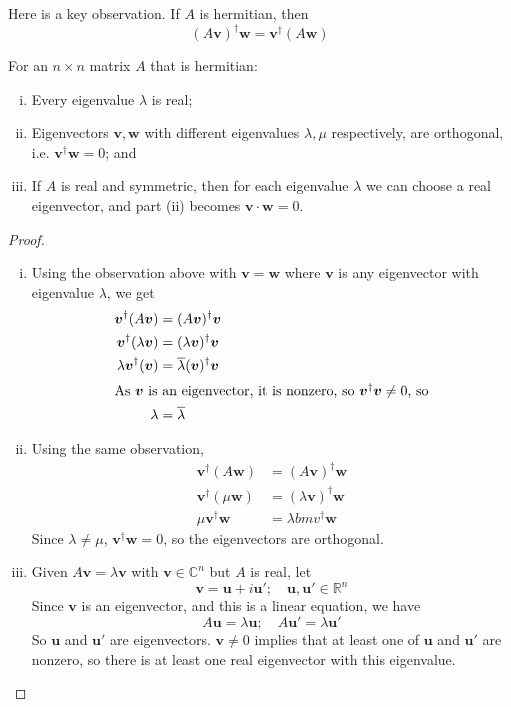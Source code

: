 \documentclass{article}
\begin{document}
Here is a key observation. If $A$ is hermitian, then
\[ (A\bm v)^\dagger \bm w = \bm v^\dagger (A \bm w) \]
\begin{theorem}
	For an $n \times n$ matrix $A$ that is hermitian:
	\begin{enumerate}[(i)]
		\item Every eigenvalue $\lambda$ is real;
		\item Eigenvectors $\bm v, \bm w$ with different eigenvalues $\lambda, \mu$ respectively, are orthogonal, i.e. $\bm v^\dagger \bm w = 0$; and
		\item If $A$ is real and symmetric, then for each eigenvalue $\lambda$ we can choose a real eigenvector, and part (ii) becomes $\bm v \cdot \bm w = 0$.
	\end{enumerate}
\end{theorem}
\begin{proof}
	\begin{enumerate}[(i)]
		\item Using the observation above with $\bm v = \bm w$ where $\bm v$ is any eigenvector with eigenvalue $\lambda$, we get
		      \begin{align*}
			      \bm v^\dagger (A\bm v)        & = (A\bm v)^\dagger \bm v                   \\
			      \bm v^\dagger (\lambda\bm v)  & = (\lambda\bm v)^\dagger \bm v             \\
			      \lambda \bm v^\dagger (\bm v) & = \overline{\lambda} (\bm v)^\dagger \bm v \\
			      \intertext{As $\bm v$ is an eigenvector, it is nonzero, so $\bm v^\dagger \bm v \neq 0$, so}
			      \lambda                       & = \overline \lambda
		      \end{align*}
		\item Using the same observation,
		      \begin{align*}
			      \bm v^\dagger (A \bm w)   & = (A \bm v)^\dagger \bm w       \\
			      \bm v^\dagger (\mu \bm w) & = (\lambda \bm v)^\dagger \bm w \\
			      \mu \bm v^\dagger \bm w   & = \lambda bm v^\dagger \bm w
		      \end{align*}
		      Since $\lambda \neq \mu$, $\bm v^\dagger \bm w = 0$, so the eigenvectors are orthogonal.
		\item Given $A\bm v = \lambda \bm v$ with $\bm v \in \mathbb C^n$ but $A$ is real, let
		      \[ \bm v = \bm u + i\bm u';\quad \bm u, \bm u' \in \mathbb R^n \]
		      Since $\bm v$ is an eigenvector, and this is a linear equation, we have
		      \[ A\bm u = \lambda \bm u;\quad A\bm u' = \lambda \bm u' \]
		      So $\bm u$ and $\bm u'$ are eigenvectors. $\bm v \neq 0$ implies that at least one of $\bm u$ and $\bm u'$ are nonzero, so there is at least one real eigenvector with this eigenvalue.
	\end{enumerate}
\end{proof}
\end{document}
